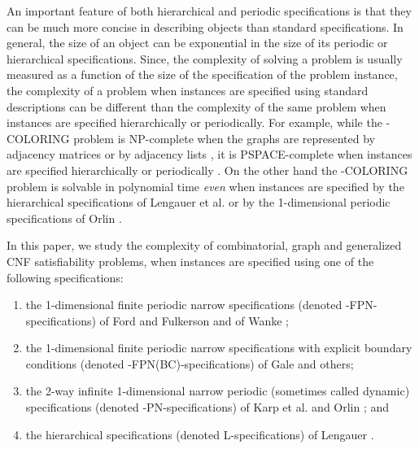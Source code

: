 An important feature of  both hierarchical and periodic 
specifications is that they
can be much  more concise in describing  objects than standard  specifications.
In general, the size of an object can be exponential in the
size of its periodic or hierarchical specifications.
Since, the  complexity of solving a problem 
is usually measured as a function of the size of the specification of the 
problem instance, 
the complexity of a problem when instances are specified using
standard descriptions can
be  different than the complexity of the same problem 
when instances are specified hierarchically or periodically.
For example, while the {-COLORING} problem is 
{\sf NP-}complete when the graphs are represented by adjacency matrices
or by adjacency lists \cite{GJ79}, it is 
{\sf PSPACE}-complete when instances are specified
hierarchically or periodically \cite{LW92,Or84b}.
On the other hand the {-COLORING} problem is solvable in polynomial time
{\em even} when instances are specified by the hierarchical
specifications of Lengauer et al. \cite{LW92,LW87a} or by  the 
1-dimensional periodic specifications of Orlin \cite{Or82a}.




In this paper, we study the complexity of combinatorial, graph and 
generalized {\sf CNF} satisfiability problems,
when instances are specified using one of the following specifications:

\begin{enumerate}
\item
the 1-dimensional finite periodic narrow specifications (denoted 
{-FPN}-specifications) of Ford and Fulkerson \cite{FF58}
and of Wanke \cite{Wa93}; 
\item
the 1-dimensional finite periodic narrow specifications with explicit 
boundary conditions (denoted {-FPN(BC)}-specifications)
of Gale \cite{Ga59}
and others; 
\item
the 2-way infinite 1-dimensional narrow
periodic (sometimes called dynamic) specifications  (denoted
{-PN}-specifications) 
of Karp et al. and Orlin \cite{KMW67,Or82a}; and 
\item
the hierarchical specifications (denoted {\sf L}-specifications) of 
Lengauer \cite{LW87a}. 

\end{enumerate}


